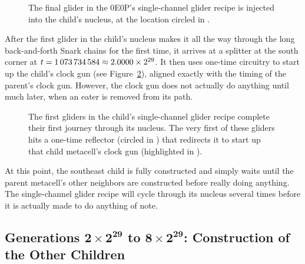 \begin{figure}[!htb]
	\centering
	\caption{The final glider in the 0E0P's single-channel glider recipe is injected into the child's nucleus, at the location circled in .}
	\label{fig:0e0p_timeline_974368517}
\end{figure}

After the first glider in the child's nucleus makes it all the way through the long back-and-forth Snark chains for the first time, it arrives at a splitter at the south corner at $t = 1{\,}073{\,}734{\,}584 \approx 2.0000 \times 2^{29}$. It then uses one-time circuitry to start up the child's clock gun (see Figure~\ref{fig:0e0p_timeline_1073734584}), aligned exactly with the timing of the parent's clock gun. However, the clock gun does not actually do anything until much later, when an eater is removed from its path.

\begin{figure}[!htb]
	\centering
	\caption{The first gliders in the child's single-channel glider recipe complete their first journey through its nucleus. The very first of these gliders hits a one-time reflector (circled in ) that redirects it to start up that child metacell's clock gun (highlighted in ).}
	\label{fig:0e0p_timeline_1073734584}
\end{figure}


At this point, the southeast child is fully constructed and simply waits until the parent metacell's other neighbors are constructed before really doing anything. The single-channel glider recipe will cycle through its nucleus several times before it is actually made to do anything of note.


\subsection{Generations $\mathbf{2 \times 2^{29}}$ to $\mathbf{8 \times 2^{29}}$: Construction of the Other Children}\label{sec:0e0p_timeline_other_child}

